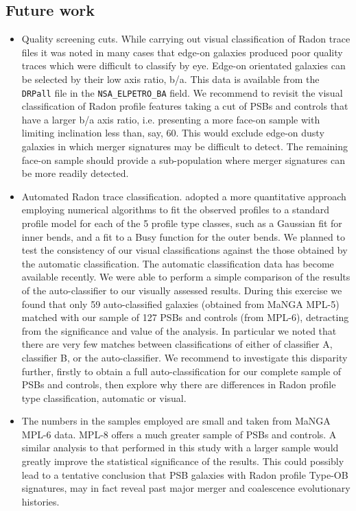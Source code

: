 \subsection{Future work}
\label{sec:future-work}

\begin{itemize}
    \item Quality screening cuts. While carrying out visual classification of Radon trace files it was noted in many cases that edge-on galaxies produced poor quality traces which were difficult to classify by eye. Edge-on orientated galaxies can be selected by their low axis ratio, b/a. This data is available from the \texttt{DRPall} file in the \texttt{NSA\_ELPETRO\_BA} field. We recommend to revisit the visual classification of Radon profile features taking a cut of PSBs and controls that have a larger b/a axis ratio, i.e. presenting a  more face-on sample with limiting inclination less than, say, 60\textdegree. This would exclude edge-on dusty galaxies in which merger signatures may be difficult to detect. The remaining face-on sample should provide a sub-population where merger signatures can be more readily detected.
    \item Automated Radon trace classification. \cite{2018MNRAS.480.2217S} adopted a more quantitative approach employing numerical algorithms to fit the observed profiles to a standard profile model for each of the 5 profile type classes, such as a Gaussian fit for inner bends, and a fit to a Busy function \citep{2014ascl.soft02015W} for the outer bends. We planned to test the consistency of our visual classifications against the those obtained by the automatic classification. The automatic classification data has become available recently. We were able to perform a simple comparison of the results of the auto-classifier to our visually assessed results. During this exercise we found that only 59 auto-classified galaxies (obtained from MaNGA MPL-5) matched with our sample of 127 PSBs and controls (from MPL-6), detracting from the significance and value of the analysis. In particular we noted that there are very few matches between classifications of either of classifier A, classifier B, or the auto-classifier. We recommend to investigate this disparity further, firstly to obtain a full auto-classification for our complete sample of PSBs and controls, then explore why there are differences in Radon profile type classification, automatic or visual. 
    \item The numbers in the samples employed are small and taken from MaNGA MPL-6 data. MPL-8 offers a much greater sample of PSBs and controls. A similar analysis to that performed in this study with a larger sample would greatly improve the statistical significance of the results. This could possibly lead to a tentative conclusion that PSB galaxies with Radon profile Type-OB signatures, may in fact reveal past major merger and coalescence evolutionary histories.
\end{itemize}